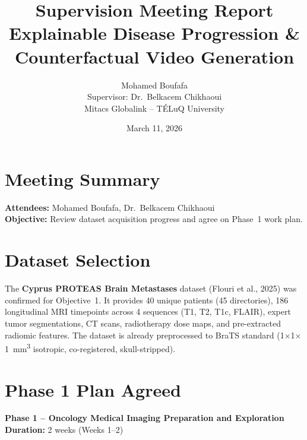 \documentclass[10pt,a4paper]{article}
\title{\vspace{-1.5cm}\textbf{Supervision Meeting Report}\\[4pt]
\large Explainable Disease Progression \& Counterfactual Video Generation}
\author{Mohamed Boufafa \\ Supervisor: Dr.~Belkacem Chikhaoui \\ Mitacs Globalink -- T\'ELuQ University}
\date{March 11, 2026}
\begin{document}
\maketitle
\vspace{-0.5cm}

\section{Meeting Summary}

\textbf{Attendees:} Mohamed Boufafa, Dr.~Belkacem Chikhaoui \\
\textbf{Objective:} Review dataset acquisition progress and agree on Phase~1 work plan.

\section{Dataset Selection}

The \textbf{Cyprus PROTEAS Brain Metastases} dataset (Flouri et al., 2025) was confirmed for Objective~1. It provides 40 unique patients (45 directories), 186 longitudinal MRI timepoints across 4 sequences (T1, T2, T1c, FLAIR), expert tumor segmentations, CT scans, radiotherapy dose maps, and pre-extracted radiomic features. The dataset is already preprocessed to BraTS standard (1$\times$1$\times$1~mm\textsuperscript{3} isotropic, co-registered, skull-stripped).

\section{Phase 1 Plan Agreed}

\textbf{Phase 1 -- Oncology Medical Imaging Preparation and Exploration}\\
\textbf{Duration:} 2 weeks (Weeks 1--2)
\end{document}
